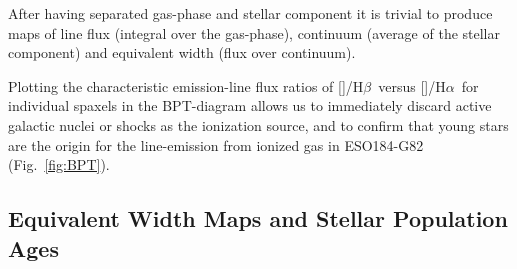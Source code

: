 \documentclass[traditabstract, referee]{aa}
\newcommand{\hb}{H$\beta$}
\newcommand{\ha}{H$\alpha$}
\newcommand{\oiii}{[\ion{O}{iii}]}
\newcommand{\nii}{[\ion{N}{ii}]}
\begin{document}
After having separated gas-phase and stellar component it is trivial to produce maps of line flux (integral over the gas-phase), continuum (average of the stellar component) and equivalent width (flux over continuum). 

Plotting the characteristic emission-line flux ratios of \oiii/\hb\, versus \nii/\ha\, for individual spaxels in the BPT-diagram \citep{1981PASP...93....5B} allows us to immediately discard active galactic nuclei or shocks as the ionization source, and to confirm that young stars are the origin for the line-emission from ionized gas in ESO184-G82 (Fig.~\ref{fig:BPT}).


\subsection{Equivalent Width Maps and Stellar Population Ages}
\end{document}
